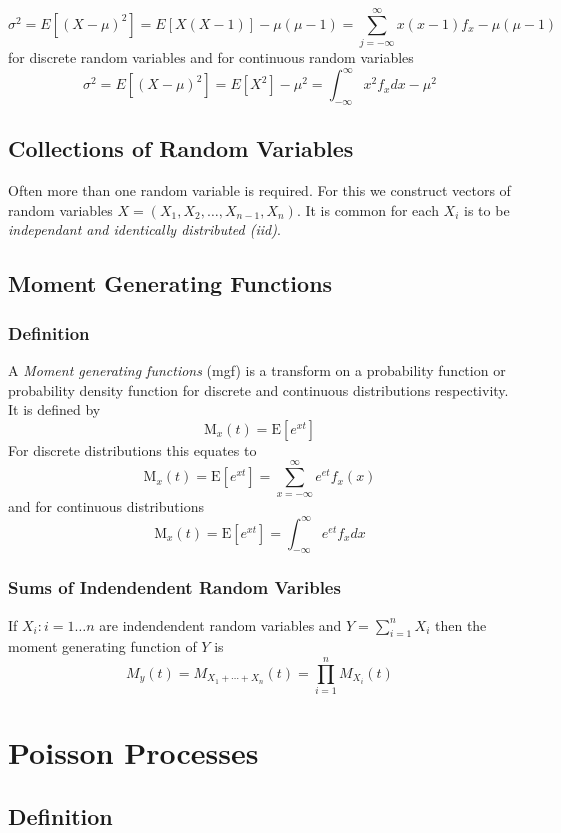 \[ \sigma^2 = E[(X-\mu)^2] = E[X(X-1)] - \mu(\mu-1) = \sum_{j =
-\infty}^{\infty}{x(x-1) f_x} - \mu(\mu-1) \]
for discrete random variables and for continuous random variables
\[ \sigma^2 = E[(X-\mu)^2] = E[X^2] - \mu^2 =
\int_{-\infty}^{\infty}{x^2 f_x dx} - \mu^2 \]

\subsection{Collections of Random Variables}

Often more than one random variable is required.  For this we
construct vectors of random variables $X = (X_1, X_2, \ldots, X_{n-1},
X_n)$.  It is common for each $X_i$ is to be {\em independant and
identically distributed (iid)}.

\subsection{Moment Generating Functions}

\subsubsection{Definition}

A {\em Moment generating functions} (mgf) is a transform on a
probability function or probability density function for discrete and
continuous distributions respectivity.  It is defined by
\[ \mbox{M}_x(t) = \mbox{E}[e^{xt}] \]
For discrete distributions this equates to
\[ \mbox{M}_x(t) = \mbox{E}[e^{xt}] = \sum_{x =
-\infty}^{\infty}e^{et}f_x(x) \]
and for continuous distributions
\[ \mbox{M}_x(t) = \mbox{E}[e^{xt}] = \int_{-\infty}^{\infty}e^{et}f_x dx \]

\subsubsection{Sums of Indendendent Random Varibles}

If ${X_i : i = 1 \ldots n}$ are indendendent random variables and $Y =
\sum_{i = 1}^{n}{X_i}$ then the moment generating function of $Y$ is
\[
M_y(t) = M_{X_1 + \cdots + X_n}(t) = \prod_{i = 1}^{n}{M_{X_i}(t)}
\]

\section{Poisson Processes}

\subsection{Definition}

